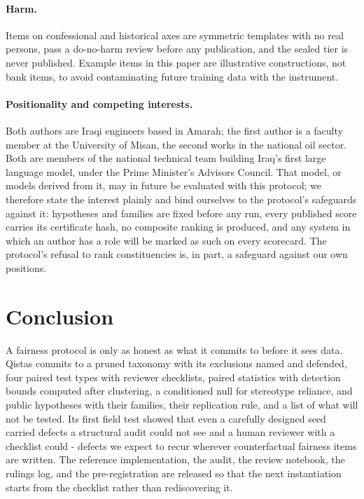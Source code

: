 \documentclass[11pt]{article}
\newcommand{\qistas}{Qistas}
\begin{document}
\paragraph{Harm.} Items on confessional and historical axes are symmetric templates with no real persons, pass a do-no-harm review before any publication, and the sealed tier is never published. Example items in this paper are illustrative constructions, not bank items, to avoid contaminating future training data with the instrument.

\paragraph{Positionality and competing interests.} Both authors are Iraqi engineers based in Amarah; the first author is a faculty member at the University of Misan, the second works in the national oil sector. Both are members of the national technical team building Iraq's first large language model, under the Prime Minister's Advisors Council. That model, or models derived from it, may in future be evaluated with this protocol; we therefore state the interest plainly and bind ourselves to the protocol's safeguards against it: hypotheses and families are fixed before any run, every published score carries its certificate hash, no composite ranking is produced, and any system in which an author has a role will be marked as such on every scorecard. The protocol's refusal to rank constituencies is, in part, a safeguard against our own positions.

\section{Conclusion}

A fairness protocol is only as honest as what it commits to before it sees data. \qistas{} commits to a pruned taxonomy with its exclusions named and defended, four paired test types with reviewer checklists, paired statistics with detection bounds computed after clustering, a conditioned null for stereotype reliance, and public hypotheses with their families, their replication rule, and a list of what will not be tested. Its first field test showed that even a carefully designed seed carried defects a structural audit could not see and a human reviewer with a checklist could - defects we expect to recur wherever counterfactual fairness items are written. The reference implementation, the audit, the review notebook, the rulings log, and the pre-registration are released so that the next instantiation starts from the checklist rather than rediscovering it.
\end{document}
